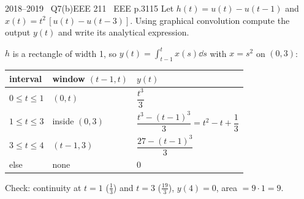 \begin{qcard}{2018--2019 \textbullet\ Q7(b)}{EEE 211 \textbullet\ EEE p.31}{15}
Let $h(t)=u(t)-u(t-1)$ and $x(t)=t^2\,[u(t)-u(t-3)]$. Using graphical convolution compute the output $y(t)$ and write its analytical expression.
\end{qcard}
\begin{solution}
$h$ is a rectangle of width 1, so $y(t)=\int_{t-1}^{t}x(s)\dd s$ with $x=s^2$ on $(0,3)$:
\begin{center}\small\begin{tabular}{@{}lll@{}}\toprule interval & window $(t-1,t)$ & $y(t)$\\\midrule
$0\le t\le1$ & $(0,t)$ & $\dfrac{t^3}{3}$\\
$1\le t\le3$ & inside $(0,3)$ & $\dfrac{t^3-(t-1)^3}{3}=t^2-t+\dfrac13$\\
$3\le t\le4$ & $(t-1,3)$ & $\dfrac{27-(t-1)^3}{3}$\\
else & none & $0$\\\bottomrule\end{tabular}\end{center}
Check: continuity at $t=1$ ($\frac13$) and $t=3$ ($\frac{19}{3}$), $y(4)=0$, area $=9\cdot1=9$.
\begin{center}\end{center}
\end{solution}

